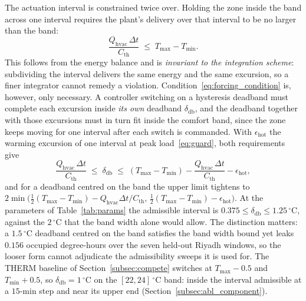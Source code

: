 \documentclass[3p,twocolumn,number]{elsarticle}
\newcommand{\Tmin}{T_{\min}}
\newcommand{\Tmax}{T_{\max}}
\newcommand{\deadband}{\delta_{\mathrm{db}}}
\newcommand{\Cth}{C_{\mathrm{th}}}
\newcommand{\Qhvac}{Q_{\mathrm{hvac}}}
\begin{document}
\begin{remark}
The actuation interval is constrained twice over. Holding the zone inside the band across one interval requires the plant's delivery over that interval to be no larger than the band:
\begin{equation}
  \frac{\Qhvac\,\Delta t}{\Cth}\;\le\;\Tmax-\Tmin .
  \label{eq:forcing_condition}
\end{equation}
This follows from the energy balance and is \emph{invariant to the integration scheme}: subdividing the interval delivers the same energy and the same excursion, so a finer integrator cannot remedy a violation. Condition~\eqref{eq:forcing_condition} is, however, only necessary. A controller switching on a hysteresis deadband must complete each excursion inside \emph{its own} deadband $\deadband$, and the deadband together with those excursions must in turn fit inside the comfort band, since the zone keeps moving for one interval after each switch is commanded. With $\epsilon_{\mathrm{hot}}$ the warming excursion of one interval at peak load~\eqref{eq:guard}, both requirements give
\begin{equation}
  \frac{\Qhvac\,\Delta t}{\Cth}\;\le\;\deadband\;\le\;
  (\Tmax-\Tmin)-\frac{\Qhvac\,\Delta t}{\Cth}-\epsilon_{\mathrm{hot}},
  \label{eq:deadband_condition}
\end{equation}
and for a deadband centred on the band the upper limit tightens to $2\min\!\bigl(\tfrac{1}{2}(\Tmax-\Tmin)-\Qhvac\Delta t/\Cth,\, \tfrac{1}{2}(\Tmax-\Tmin)-\epsilon_{\mathrm{hot}}\bigr)$. At the parameters of Table~\ref{tab:params} the admissible interval is $0.375\le\deadband\le1.25\,^\circ$C, against the $2\,^\circ$C that the band width alone would allow. The distinction matters: a $1.5\,^\circ$C deadband centred on the band satisfies the band width bound yet leaks $0.156$ occupied degree-hours over the seven held-out Riyadh windows, so the looser form cannot adjudicate the admissibility sweeps it is used for. The THERM baseline of Section~\ref{subsec:compete} switches at $\Tmax-0.5$ and $\Tmin+0.5$, so $\deadband=1\,^\circ$C on the $[22,24]\,^\circ$C band: inside the interval admissible at a $15$-min step and near its upper end (Section~\ref{subsec:abl_component}).


\end{remark}
\end{document}
